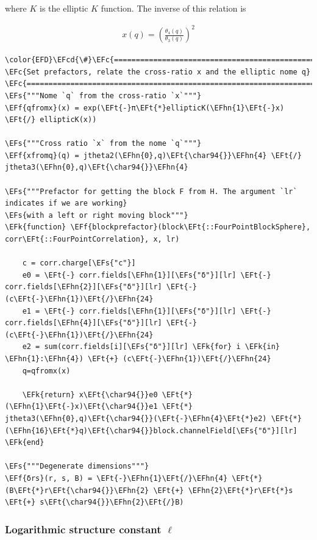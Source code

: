 \documentclass[a4paper]{article}
\numberwithin{equation}{section}
\newcommand{\EFc}[1]{\textcolor{EFc}{#1}} %
\newcommand{\EFcd}[1]{\textcolor{EFcd}{#1}} %
\newcommand{\EFs}[1]{\textcolor{EFs}{#1}} %
\newcommand{\EFk}[1]{\textcolor{EFk}{#1}} %
\newcommand{\EFf}[1]{\textcolor{EFf}{#1}} %
\newcommand{\EFt}[1]{\textcolor{EFt}{#1}} %
\newcommand{\EFhn}[1]{\textcolor{EFhn}{#1}} %
\begin{document}
where \(K\) is the elliptic \(K\) function. The inverse of this relation is

\begin{align}
x(q) = \left(\frac{\theta_{4}(q)}{\theta_{3}(q)}\right)^{2}
\end{align}


\begin{Code}
\begin{Verbatim}
\color{EFD}\EFcd{\#}\EFc{===========================================================================================}
\EFc{Set prefactors, relate the cross-ratio x and the elliptic nome q}
\EFc{===========================================================================================\#}
\EFs{"""Nome `q` from the cross-ratio `x`"""}
\EFf{qfromx}(x) = exp(\EFt{-}π\EFt{*}ellipticK(\EFhn{1}\EFt{-}x) \EFt{/} ellipticK(x))

\EFs{"""Cross ratio `x` from the nome `q`"""}
\EFf{xfromq}(q) = jtheta2(\EFhn{0},q)\EFt{\char94{}}\EFhn{4} \EFt{/} jtheta3(\EFhn{0},q)\EFt{\char94{}}\EFhn{4}

\EFs{"""Prefactor for getting the block F from H. The argument `lr` indicates if we are working}
\EFs{with a left or right moving block"""}
\EFk{function} \EFf{blockprefactor}(block\EFt{::FourPointBlockSphere}, corr\EFt{::FourPointCorrelation}, x, lr)

    c = corr.charge[\EFs{"c"}]
    e0 = \EFt{-} corr.fields[\EFhn{1}][\EFs{"δ"}][lr] \EFt{-} corr.fields[\EFhn{2}][\EFs{"δ"}][lr] \EFt{-} (c\EFt{-}\EFhn{1})\EFt{/}\EFhn{24}
    e1 = \EFt{-} corr.fields[\EFhn{1}][\EFs{"δ"}][lr] \EFt{-} corr.fields[\EFhn{4}][\EFs{"δ"}][lr] \EFt{-} (c\EFt{-}\EFhn{1})\EFt{/}\EFhn{24}
    e2 = sum(corr.fields[i][\EFs{"δ"}][lr] \EFk{for} i \EFk{in} \EFhn{1}:\EFhn{4}) \EFt{+} (c\EFt{-}\EFhn{1})\EFt{/}\EFhn{24}
    q=qfromx(x)

    \EFk{return} x\EFt{\char94{}}e0 \EFt{*} (\EFhn{1}\EFt{-}x)\EFt{\char94{}}e1 \EFt{*} jtheta3(\EFhn{0},q)\EFt{\char94{}}(\EFt{-}\EFhn{4}\EFt{*}e2) \EFt{*} (\EFhn{16}\EFt{*}q)\EFt{\char94{}}block.channelField[\EFs{"δ"}][lr]
\EFk{end}

\EFs{"""Degenerate dimensions"""}
\EFf{δrs}(r, s, B) = \EFt{-}\EFhn{1}\EFt{/}\EFhn{4} \EFt{*} (B\EFt{*}r\EFt{\char94{}}\EFhn{2} \EFt{+} \EFhn{2}\EFt{*}r\EFt{*}s \EFt{+} s\EFt{\char94{}}\EFhn{2}\EFt{/}B)
\end{Verbatim}
\end{Code}
\subsubsection*{Logarithmic structure constant \(\ell\)}
\label{sec:org0c8694b}
\end{document}
